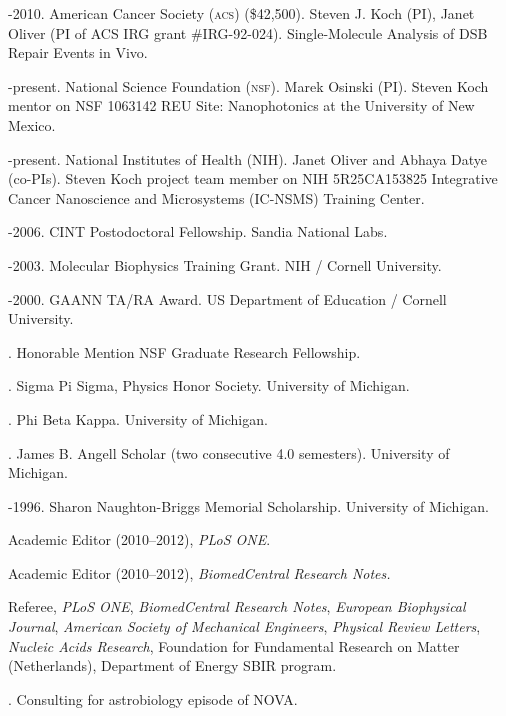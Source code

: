 \documentclass[11pt]{article}
\begin{document}
-2010. American Cancer Society (\textsc{acs}) (\$42,500).  Steven J. Koch (PI), Janet Oliver (PI of ACS IRG grant \#IRG-92-024). Single-Molecule Analysis of DSB Repair Events in Vivo.

-present. National Science Foundation (\textsc{nsf}). Marek Osinski (PI). Steven Koch mentor on NSF 1063142 REU Site: Nanophotonics at the University of New Mexico.

-present. National Institutes of Health (\textsc{NIH}). Janet Oliver and Abhaya Datye (co-PIs). Steven Koch project team member on NIH 5R25CA153825 Integrative Cancer Nanoscience and Microsystems (IC-NSMS) Training Center.

-2006. CINT Postodoctoral Fellowship.  Sandia National Labs.

-2003. Molecular Biophysics Training Grant. NIH / Cornell University.

-2000. GAANN TA/RA Award.  US Department of Education / Cornell University.

. Honorable Mention NSF Graduate Research Fellowship.

. Sigma Pi Sigma, Physics Honor Society. University of Michigan.

. Phi Beta Kappa. University of Michigan.

. James B. Angell Scholar (two consecutive 4.0 semesters). University of Michigan.

-1996. Sharon Naughton-Briggs Memorial Scholarship.  University of Michigan.

\bigskip 

\newpage

\medskip

\medskip

\ind Academic Editor (2010--2012), \emph{PLoS ONE}.

\ind Academic Editor (2010--2012), \emph{BiomedCentral Research Notes.}

\ind Referee, \emph{PLoS ONE}, \emph{BiomedCentral Research Notes},
\emph{European Biophysical Journal}, \emph{American Society of Mechanical Engineers}, \emph{Physical Review Letters}, \emph{Nucleic Acids Research}, Foundation for Fundamental Research on Matter (Netherlands), Department of Energy SBIR program.

. Consulting for astrobiology episode of NOVA.
\end{document}
